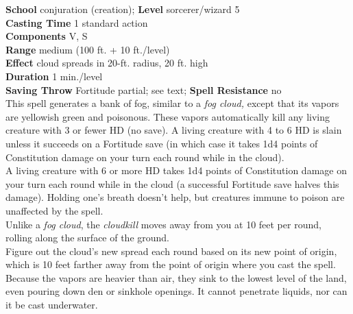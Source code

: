 \textbf{School} conjuration (creation); \textbf{Level} sorcerer/wizard 5\\
\textbf{Casting Time} 1 standard action\\
\textbf{Components} V, S\\
\textbf{Range }medium (100 ft. + 10 ft./level)\\
\textbf{Effect} cloud spreads in 20-ft. radius, 20 ft. high\\
\textbf{Duration} 1 min./level\\
\textbf{Saving Throw} Fortitude partial; see text; \textbf{Spell Resistance} no\\
This spell generates a bank of fog, similar to a \textit{fog cloud, }except that its vapors are yellowish green and poisonous. These vapors automatically kill any living creature with 3 or fewer HD (no save). A living creature with 4 to 6 HD is slain unless it succeeds on a Fortitude save (in which case it takes 1d4 points of Constitution damage on your turn each round while in the cloud).\\
A living creature with 6 or more HD takes 1d4 points of Constitution damage on your turn each round while in the cloud (a successful Fortitude save halves this damage). Holding one's breath doesn't help, but creatures immune to poison are unaffected by the spell.\\
Unlike a \textit{fog cloud}, the \textit{cloudkill }moves away from you at 10 feet per round, rolling along the surface of the ground.\\
Figure out the cloud's new spread each round based on its new point of origin, which is 10 feet farther away from the point of origin where you cast the spell.\\
Because the vapors are heavier than air, they sink to the lowest level of the land, even pouring down den or sinkhole openings. It cannot penetrate liquids, nor can it be cast underwater.\\
